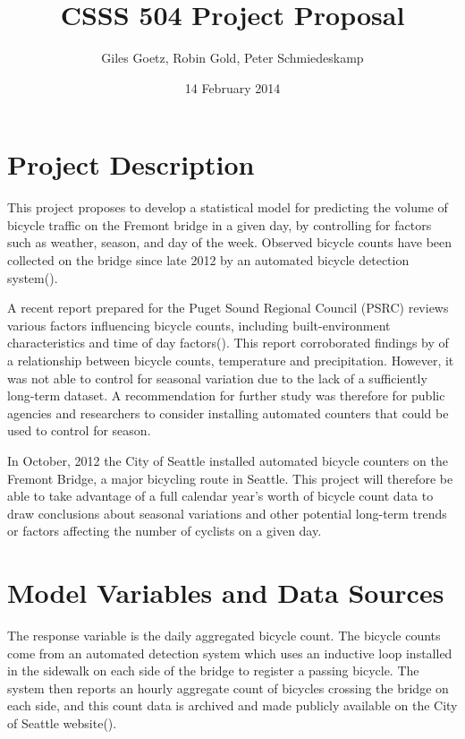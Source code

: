 \documentclass[11pt,letterpaper,article]{memoir} %
\title{CSSS 504 Project Proposal}
\author{Giles Goetz, Robin Gold, Peter Schmiedeskamp}
\date{14 February 2014} %
\begin{document}
\maketitle


\chapter*{Project Description}
This project proposes to develop a statistical model for predicting the volume of bicycle traffic on the Fremont bridge in a given day, by controlling for factors such as weather, season, and day of the week. Observed bicycle counts have been collected on the bridge since late 2012 by an automated bicycle detection system(\cite{City-of-Seattle:aa}). 

 A recent report prepared for the Puget Sound Regional Council (PSRC) reviews various factors influencing bicycle counts, including built-environment characteristics and time of day factors(\cite{Bassok:2011aa}). This report corroborated findings by \textcite{City-of-Vancouver:1999aa,Niemeier:1996aa,Parkin:2008aa} of a relationship between bicycle counts, temperature and precipitation. However, it was not able to control for seasonal variation due to the lack of a sufficiently long-term dataset. A recommendation for further study was therefore for public agencies and researchers to consider installing automated counters that could be used to control for season. 

In October, 2012 the City of Seattle installed automated bicycle counters on the Fremont Bridge, a major bicycling route in Seattle. This project will therefore be able to take advantage of a full calendar year's worth of bicycle count data to draw conclusions about seasonal variations and other potential long-term trends or factors affecting the number of cyclists on a given day. 

\chapter*{Model Variables and Data Sources}
The response variable is the daily aggregated bicycle count. The bicycle counts come from an automated detection system which uses an inductive loop installed in the sidewalk on each side of the bridge to register a passing bicycle. The system then reports an hourly aggregate count of bicycles crossing the bridge on each side, and this count data is archived and made publicly available on the City of Seattle website(\cite{CoSwebsite}). 
\end{document}

